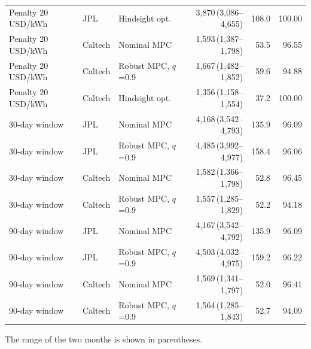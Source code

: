 \begin{table}[H]
\begin{tabular*}{\textwidth}{@{\extracolsep{\fill}}lllrrr@{}}
Penalty 20\,USD/kWh & JPL & Hindsight opt. & 3,870\,{\scriptsize(3,086--4,655)} & 108.0 & 100.00 \\
Penalty 20\,USD/kWh & Caltech & Nominal MPC & 1,593\,{\scriptsize(1,387--1,798)} & 53.5 & 96.55 \\
Penalty 20\,USD/kWh & Caltech & Robust MPC, $q$=0.9 & 1,667\,{\scriptsize(1,482--1,852)} & 59.6 & 94.88 \\
Penalty 20\,USD/kWh & Caltech & Hindsight opt. & 1,356\,{\scriptsize(1,158--1,554)} & 37.2 & 100.00 \\
\hline
30-day window & JPL & Nominal MPC & 4,168\,{\scriptsize(3,542--4,793)} & 135.9 & 96.09 \\
30-day window & JPL & Robust MPC, $q$=0.9 & 4,485\,{\scriptsize(3,992--4,977)} & 158.4 & 96.06 \\
30-day window & Caltech & Nominal MPC & 1,582\,{\scriptsize(1,366--1,798)} & 52.8 & 96.45 \\
30-day window & Caltech & Robust MPC, $q$=0.9 & 1,557\,{\scriptsize(1,285--1,829)} & 52.2 & 94.18 \\
\hline
90-day window & JPL & Nominal MPC & 4,167\,{\scriptsize(3,542--4,792)} & 135.9 & 96.09 \\
90-day window & JPL & Robust MPC, $q$=0.9 & 4,503\,{\scriptsize(4,032--4,975)} & 159.2 & 96.22 \\
90-day window & Caltech & Nominal MPC & 1,569\,{\scriptsize(1,341--1,797)} & 52.0 & 96.41 \\
90-day window & Caltech & Robust MPC, $q$=0.9 & 1,564\,{\scriptsize(1,285--1,843)} & 52.7 & 94.09 \\
\hline
\end{tabular*}
\par\smallskip\parbox{\textwidth}{\scriptsize The range of the two months is shown in parentheses.}
\end{table}
